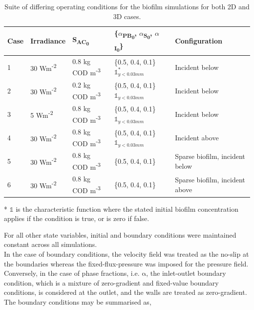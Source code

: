 \begin{table}[H]
    \centering
    \small
    \renewcommand{\arraystretch}{1.4}
    \caption{Suite of differing operating conditions for the biofilm simulations for both 2D and 3D cases.}
    \tabcolsep=0.11cm
    \begin{tabular}{@{}p{1cm} p{2cm} p{3cm} p{5cm} p{5cm}@{}} \toprule
Case & Irradiance  & S\textsubscript{AC\textsubscript{0}}  & \{$\alpha$\textsubscript{PB\textsubscript{0}}, $\alpha$\textsubscript{S\textsubscript{0}}, $\alpha$\textsubscript{I\textsubscript{0}}\}  &  Configuration \\ \hline
1    &  30 Wm\textsuperscript{-2}  &    0.8 kg COD m\textsuperscript{-3}    &  \{0.5, 0.4, 0.1\}$\mathds{1}^*_{y<0.03mm}$  & Incident below\\
2     &  30 Wm\textsuperscript{-2}  &    0.2 kg COD m\textsuperscript{-3}    &  \{0.5, 0.4, 0.1\}$\mathds{1}_{y<0.03mm}$ & Incident below\\
3    &  5 Wm\textsuperscript{-2}  &    0.8 kg COD m\textsuperscript{-3}    &  \{0.5, 0.4, 0.1\}$\mathds{1}_{y<0.03mm}$  & Incident below\\
4    &  30 Wm\textsuperscript{-2}  &    0.8 kg COD m\textsuperscript{-3}    &  \{0.5, 0.4, 0.1\}$\mathds{1}_{y<0.03mm}$  & Incident above\\
5    &  30 Wm\textsuperscript{-2}  &    0.8 kg COD m\textsuperscript{-3}    &  \{0.5, 0.4, 0.1\}  & Sparse biofilm, incident below\\
6    &  30 Wm\textsuperscript{-2}  &    0.8 kg COD m\textsuperscript{-3}    &  \{0.5, 0.4, 0.1\}  & Sparse biofilm, incident above\\ \hline
    \end{tabular}
  \scriptsize{
     * $\mathds{1}$ is the characteristic function where the stated initial biofilm concentration applies if the condition is true, or is zero if false.} 
    \label{tab:biofilm_cases}
\end{table}

For all other state variables, initial and boundary conditions were maintained constant across all simulations.\\

In the case of boundary conditions, the velocity field was treated as the no-slip at the boundaries whereas the fixed-flux-pressure was imposed for the pressure field. Conversely, in the case of phase fractions, i.e. $\mathrm{\alpha}$, the inlet-outlet boundary condition, which is a mixture of zero-gradient and fixed-value boundary conditions, is considered at the outlet, and the walls are treated as zero-gradient. The boundary conditions may be summarised as,  


